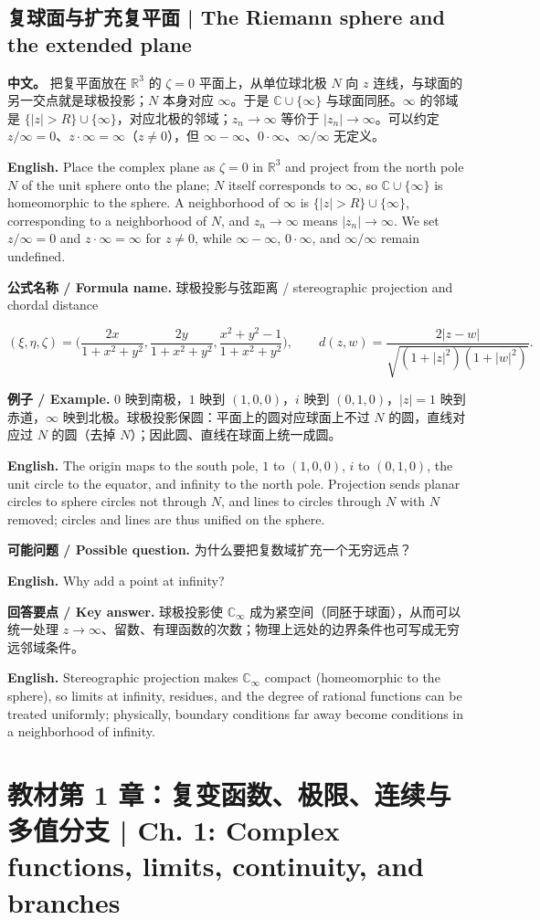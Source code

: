 \documentclass[UTF8,11pt,a4paper]{ctexart}
\newcommand{\EN}[1]{\par\noindent \textbf{English.} #1\par}
\newcommand{\FORMULA}[2]{\par\noindent\textbf{公式名称 / Formula name.} #1 / #2\par}
\newcommand{\EX}[2]{\par\noindent \textbf{例子 / Example.} #1\par\EN{#2}}
\newcommand{\ASK}[4]{\par\noindent \textbf{可能问题 / Possible question.} #1\par\EN{#2}\noindent \textbf{回答要点 / Key answer.} #3\par\EN{#4}\medskip}
\newcommand{\APS}[2]{\par\noindent\textbf{中文。} #1\par\noindent\textbf{English.} #2\par\smallskip}
\begin{document}
\subsection{复球面与扩充复平面 | The Riemann sphere and the extended plane}
\APS{把复平面放在 $\mathbb R^3$ 的 $\zeta=0$ 平面上，从单位球北极 $N$ 向 $z$ 连线，与球面的另一交点就是球极投影；$N$ 本身对应 $\infty$。于是 $\mathbb C\cup\{\infty\}$ 与球面同胚。$\infty$ 的邻域是 $\{|z|>R\}\cup\{\infty\}$，对应北极的邻域；$z_n\to\infty$ 等价于 $|z_n|\to\infty$。可以约定 $z/\infty=0$、$z\cdot\infty=\infty$（$z\ne0$），但 $\infty-\infty$、$0\cdot\infty$、$\infty/\infty$ 无定义。}{Place the complex plane as $\zeta=0$ in $\mathbb R^3$ and project from the north pole $N$ of the unit sphere onto the plane; $N$ itself corresponds to $\infty$, so $\mathbb C\cup\{\infty\}$ is homeomorphic to the sphere. A neighborhood of $\infty$ is $\{|z|>R\}\cup\{\infty\}$, corresponding to a neighborhood of $N$, and $z_n\to\infty$ means $|z_n|\to\infty$. We set $z/\infty=0$ and $z\cdot\infty=\infty$ for $z\ne0$, while $\infty-\infty$, $0\cdot\infty$, and $\infty/\infty$ remain undefined.}
\FORMULA{球极投影与弦距离}{stereographic projection and chordal distance}
\[
(\xi,\eta,\zeta)=\Big(\frac{2x}{1+x^2+y^2},\frac{2y}{1+x^2+y^2},\frac{x^2+y^2-1}{1+x^2+y^2}\Big),\qquad
d(z,w)=\frac{2|z-w|}{\sqrt{(1+|z|^2)(1+|w|^2)}}.
\]
\EX{$0$ 映到南极，$1$ 映到 $(1,0,0)$，$i$ 映到 $(0,1,0)$，$|z|=1$ 映到赤道，$\infty$ 映到北极。球极投影保圆：平面上的圆对应球面上不过 $N$ 的圆，直线对应过 $N$ 的圆（去掉 $N$）；因此圆、直线在球面上统一成圆。}{The origin maps to the south pole, $1$ to $(1,0,0)$, $i$ to $(0,1,0)$, the unit circle to the equator, and infinity to the north pole. Projection sends planar circles to sphere circles not through $N$, and lines to circles through $N$ with $N$ removed; circles and lines are thus unified on the sphere.}
\ASK{为什么要把复数域扩充一个无穷远点？}{Why add a point at infinity?}{球极投影使 $\mathbb C_\infty$ 成为紧空间（同胚于球面），从而可以统一处理 $z\to\infty$、留数、有理函数的次数；物理上远处的边界条件也可写成无穷远邻域条件。}{Stereographic projection makes $\mathbb C_\infty$ compact (homeomorphic to the sphere), so limits at infinity, residues, and the degree of rational functions can be treated uniformly; physically, boundary conditions far away become conditions in a neighborhood of infinity.}
\section[教材第 1 章 复函数与极限]{教材第 1 章：复变函数、极限、连续与多值分支 | Ch. 1: Complex functions, limits, continuity, and branches}
\end{document}
